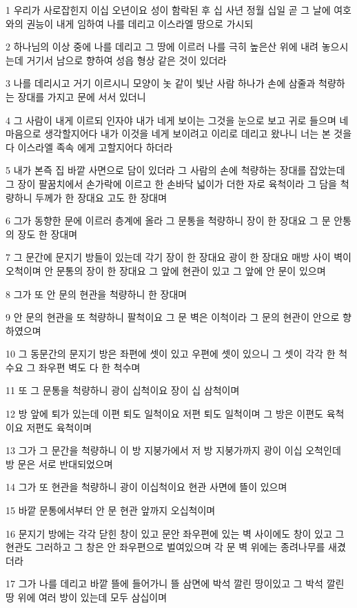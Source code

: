 \par 1 우리가 사로잡힌지 이십 오년이요 성이 함락된 후 십 사년 정월 십일 곧 그 날에 여호와의 권능이 내게 임하여 나를 데리고 이스라엘 땅으로 가시되
\par 2 하나님의 이상 중에 나를 데리고 그 땅에 이르러 나를 극히 높은산 위에 내려 놓으시는데 거기서 남으로 향하여 성읍 형상 같은 것이 있더라
\par 3 나를 데리시고 거기 이르시니 모양이 놋 같이 빛난 사람 하나가 손에 삼줄과 척량하는 장대를 가지고 문에 서서 있더니
\par 4 그 사람이 내게 이르되 인자야 내가 네게 보이는 그것을 눈으로 보고 귀로 들으며 네 마음으로 생각할지어다 내가 이것을 네게 보이려고 이리로 데리고 왔나니 너는 본 것을 다 이스라엘 족속 에게 고할지어다 하더라
\par 5 내가 본즉 집 바깥 사면으로 담이 있더라 그 사람의 손에 척량하는 장대를 잡았는데 그 장이 팔꿈치에서 손가락에 이르고 한 손바닥 넓이가 더한 자로 육척이라 그 담을 척량하니 두께가 한 장대요 고도 한 장대며
\par 6 그가 동향한 문에 이르러 층계에 올라 그 문통을 척량하니 장이 한 장대요 그 문 안통의 장도 한 장대며
\par 7 그 문간에 문지기 방들이 있는데 각기 장이 한 장대요 광이 한 장대요 매방 사이 벽이 오척이며 안 문통의 장이 한 장대요 그 앞에 현관이 있고 그 앞에 안 문이 있으며
\par 8 그가 또 안 문의 현관을 척량하니 한 장대며
\par 9 안 문의 현관을 또 척량하니 팔척이요 그 문 벽은 이척이라 그 문의 현관이 안으로 향하였으며
\par 10 그 동문간의 문지기 방은 좌편에 셋이 있고 우편에 셋이 있으니 그 셋이 각각 한 척수요 그 좌우편 벽도 다 한 척수며
\par 11 또 그 문통을 척량하니 광이 십척이요 장이 십 삼척이며
\par 12 방 앞에 퇴가 있는데 이편 퇴도 일척이요 저편 퇴도 일척이며 그 방은 이편도 육척이요 저편도 육척이며
\par 13 그가 그 문간을 척량하니 이 방 지붕가에서 저 방 지붕가까지 광이 이십 오척인데 방 문은 서로 반대되었으며
\par 14 그가 또 현관을 척량하니 광이 이십척이요 현관 사면에 뜰이 있으며
\par 15 바깥 문통에서부터 안 문 현관 앞까지 오십척이며
\par 16 문지기 방에는 각각 닫힌 창이 있고 문안 좌우편에 있는 벽 사이에도 창이 있고 그 현관도 그러하고 그 창은 안 좌우편으로 벌여있으며 각 문 벽 위에는 종려나무를 새겼더라
\par 17 그가 나를 데리고 바깥 뜰에 들어가니 뜰 삼면에 박석 깔린 땅이있고 그 박석 깔린 땅 위에 여러 방이 있는데 모두 삼십이며

